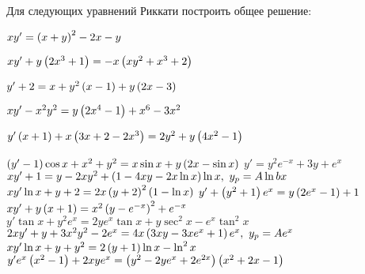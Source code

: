 	\pagebreak

	Для следующих уравнений Риккати построить общее решение:
	\begin{enumtasks}

		\label{firstorder:to_linear_riccati}
		\item \( xy' = \left( x + y \right)^2 - 2x - y \) 																		%
		\item \( xy' + y \left( 2x^3 + 1 \right) = -x \left( xy^2 + x^3 + 2 \right) \) 												%
		\item \( y' + 2 = x + y^2 \left( x - 1 \right) + y \left( 2x - 3 \right) \) 													%
		\item \( xy' - x^2 y^2 = y \left( 2x^4 - 1 \right) + x^6 - 3x^2 \) 													%
		\item \( y' \left( x + 1 \right) + x \left( 3x + 2 - 2x^3 \right) = 2 y^2 + y \left( 4x^2 - 1 \right) \) 							%
		\item \( \left( y' - 1 \right) \cos{x} + x^2 + y^2 = x \sin{x} + y \left( 2x - \sin{x} \right) \) 							%
		\itemstar \( y' = y^2 e^{-x} + 3y + e^{x} \) 																	%
		\itemstar \( xy' + 1 = y - 2xy^2 + \left( 1 - 4xy - 2x \ln{x} \right) \ln{x}, ~ y_p = A \ln{bx} \)						%
		\itemstar \( xy' \ln{x} + y + 2 = 2x\left( y + 2 \right)^2 \left( 1 - \ln{x} \right) \)										%
		\itemstar \( y' + \left( y^2 + 1 \right) e^{x} = y \left( 2e^{x} - 1 \right) + 1 \) 											%
		\itemstar \( xy' + y \left( x + 1 \right) = x^2 \left( y - e^{-x} \right)^2 + e^{-x} \) 										%
		\itemstar \( y' \tan{x} + y^2 e^{x} = 2ye^{x} \tan{x} + y \sec^2{x} - e^{x} \tan^2{x} \)						%
		\itemstar \( 2xy' + y + 3 x^2 y^{2} - 2e^{x} = 4 x \left( 3xy - 3xe^{x} + 1 \right) e^{x}, ~ y_p = Ae^{x} \)			%
		\itemstar \( xy' \ln{x} + y + y^2 = 2 \left( y + 1 \right) \ln{x} - \ln^2{x} \) 										%
		\itemstar \( y' e^{x} \left( x^2 - 1 \right) + 2xye^{x} = \left( y^2 - 2ye^{x} + 2e^{2x} \right) \left( x^2 + 2 x - 1 \right) \)		%

	\end{enumtasks}
